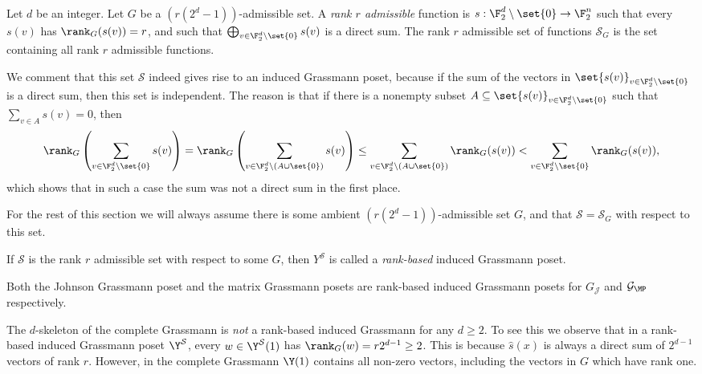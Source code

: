\begin{definition}
    Let \(d\) be an integer. Let \(G\) be a \((r(2^{d}-1))\)-admissible set. A \emph{rank \(r\) admissible} function is \(s:\F_2^d \setminus \set{0} \to \F_2^n\) such that every \(s(v)\) has \(\rank_G(s(v)) = r\), and such that \(\bigoplus_{v \in \F_2^d \setminus \set{0}} s(v)\) is a direct sum. The rank \(r\) admissible set of functions \(\mathcal{S}_G\) is the set containing all rank \(r\) admissible functions.
\end{definition}
We comment that this set \(\mathcal{S}\) indeed gives rise to an induced Grassmann poset, because if the sum of the vectors in \(\set{s(v)}_{v \in \F_2^d \setminus \set{0}}\) is a direct sum, then this set is independent. The reason is that if there is a nonempty subset \(A \subseteq \set{s(v)}_{v \in \F_2^d \setminus \set{0}}\) such that \(\sum_{ v \in A}s(v) = 0\), then 
\[\rank_G\left (\sum_{v \in \F_2^d \setminus \set{0}} s(v) \right )= \rank_G \left(\sum_{v \in \F_2^d \setminus (A \cup \set{0})}s(v) \right) \leq \sum_{v \in \F_2^d \setminus (A \cup \set{0})}\rank_G(s(v)) < \sum_{v \in \F_2^d \setminus \set{0}}\rank_G(s(v)), \]
which shows that in such a case the sum was not a direct sum in the first place.

For the rest of this section we will always assume there is some ambient \((r(2^{d}-1))\)-admissible set \(G\), and that \(\mathcal{S} = \mathcal{S}_G\) with respect to this set.

\begin{definition}
    If \(\mathcal{S}\) is the rank \(r\) admissible set with respect to some \(G\), then \(Y^{\mathcal{S}}\) is called a \emph{rank-based} induced Grassmann poset.
\end{definition}
\begin{example}
    Both the Johnson Grassmann poset and the matrix Grassmann posets are rank-based induced Grassmann posets for \(G_{\mathcal{J}}\) and \(\mathcal{G}_{\MP}\) respectively.
\end{example}

\begin{example}
    The \(d\)-skeleton of the complete Grassmann is \emph{not} a rank-based induced Grassmann for any \(d \geq 2\). To see this we observe that in a rank-based induced Grassmann poset $\Y^{\mathcal{S}}$, every \(w \in \Y^{\mathcal{S}}(1)\) has \(\rank_G(w) = r2^{d-1} \geq 2\). This is because \(\widehat{s}(x)\) is always a direct sum of \(2^{d-1}\) vectors of rank \(r\). However, in the complete Grassmann \(\Y(1)\) contains all non-zero vectors, including the vectors in \(G\) which have rank one.
\end{example}

